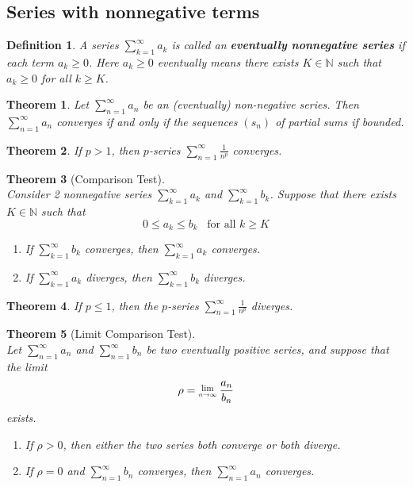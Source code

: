 \documentclass[12pt]{article}
\newcommand{\Lim}[1]{\raisebox{0.5ex}{\scalebox{0.8}{$\displaystyle \lim_{#1}\;$}}}
\newtheorem{definition}{Definition}[section]
\newtheorem{theorem}{Theorem}[section]
\theoremstyle{definition}
\begin{document}
\subsection{Series with nonnegative terms}
\begin{definition}\normalfont A series $\sum_{k=1}^\infty a_k$ is called an \textbf{eventually nonnegative series} if each term $a_k\geq 0$. Here $a_k\geq 0$ eventually means there exists $K\in\mathbb{N}$ such that $a_k\geq 0$ for all $k\geq K$.
\end{definition}
\begin{theorem}\normalfont Let $\sum_{n=1}^\infty a_n$ be an (eventually) non-negative series. Then $\sum_{n=1}^\infty a_n$ converges if and only if the sequences $(s_n)$ of partial sums if bounded.
\end{theorem}
\begin{theorem}\normalfont If $p>1$, then $p$-series $\sum_{n=1}^\infty \frac{1}{n^p}$ converges.
\end{theorem}
\begin{theorem}[Comparison Test]
\hfill\\\normalfont Consider 2 nonnegative series $\sum_{k=1}^\infty a_k$ and $\sum_{k=1}^\infty b_k$. Suppose that there exists $K\in\mathbb{N}$ such that
\[
0\leq a_k\leq b_k\;\;\;\text{for all }k\geq K
\] 
\begin{enumerate}
\item If $\sum_{k=1}^\infty b_k$ converges, then $\sum_{k=1}^\infty a_k$ converges.
\item If $\sum_{k=1}^\infty a_k$ diverges, then $\sum_{k=1}^\infty b_k$ diverges.
\end{enumerate}
\end{theorem}
\begin{theorem}\normalfont If $p\leq 1$, then the $p$-series $\sum_{n=1}^\infty \frac{1}{n^p}$ diverges.
\end{theorem}
\begin{theorem}[Limit Comparison Test]
\hfill\\\normalfont Let $\sum_{n=1}^\infty a_n$ and $\sum_{n=1}^\infty b_n$ be two eventually positive series, and suppose that the limit
\[
\rho = \Lim{n\to\infty}\frac{a_n}{b_n}
\]
exists.
\begin{enumerate}
\item If $\rho>0$, then either the two series both converge or both diverge.
\item If $\rho=0$ and $\sum_{n=1}^\infty b_n$ converges, then $\sum_{n=1}^\infty a_n$ converges.
\end{enumerate}
\end{theorem}
\end{document}
